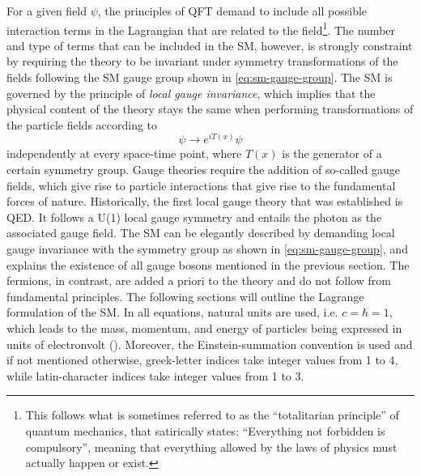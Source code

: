 For a given field $\psi$, the principles of QFT demand to include all possible interaction terms in the Lagrangian that are related to the field\footnote{This follows what is sometimes referred to as the ``totalitarian principle'' of quantum mechanics, that satirically states: ``Everything not forbidden is compulsory'', meaning that everything allowed by the laws of physics must actually happen or exist.}.
The number and type of terms that can be included in the SM, however, is strongly constraint by requiring the theory to be invariant under symmetry transformations of the fields following the SM gauge group shown in \cref{eq:sm-gauge-group}.
The SM is governed by the principle of \emph{local gauge invariance}, which implies that the physical content of the theory stays the same when performing transformations of the particle fields according to
\begin{equation}
  \psi \rightarrow e^{iT(x)} \psi
\end{equation}
independently at every space-time point, where $T(x)$ is the generator of a certain symmetry group.
Gauge theories require the addition of so-called gauge fields, which give rise to particle interactions that give rise to the fundamental forces of nature. 
Historically, the first local gauge theory that was established is QED. It follows a U(1) local gauge symmetry and entails the photon as the associated gauge field. 
The SM can be elegantly described by demanding local gauge invariance with the symmetry group as shown in \cref{eq:sm-gauge-group}, and explains the existence of all gauge bosons mentioned in the previous section. 
The fermions, in contrast, are added a priori to the theory and do not follow from fundamental principles.
The following sections will outline the Lagrange formulation of the SM.
In all equations, natural units are used, i.e. $c = \hbar = 1$, which leads to the mass, momentum, and energy of particles being expressed in units of electronvolt (\eV).
Moreover, the Einstein-summation convention is used and if not mentioned otherwise, greek-letter indices take integer values from 1 to 4, while latin-character indices take integer values from 1 to 3.

